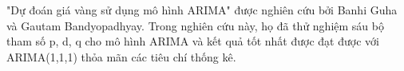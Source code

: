 "Dự đoán giá vàng sử dụng mô hình ARIMA" được nghiên cứu bởi Banhi Guha và Gautam Bandyopadhyay\cite{article2}. Trong nghiên cứu này, họ đã thử nghiệm sáu bộ tham số p, d, q cho mô hình ARIMA và kết quả tốt nhất được đạt được với ARIMA(1,1,1) thỏa mãn các tiêu chí thống kê.